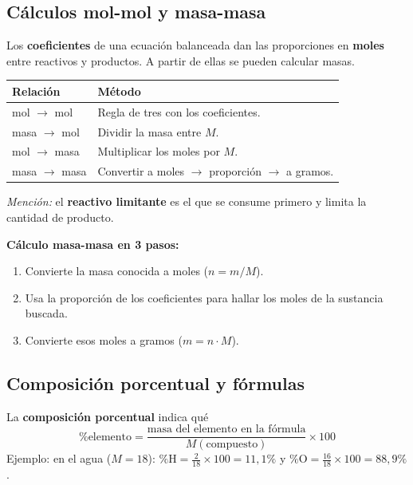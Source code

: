 \documentclass[12pt, letterpaper]{article}
\begin{document}
\subsection{Cálculos mol-mol y masa-masa}

\begin{cuadroteoria}
  Los \textbf{coeficientes} de una ecuación balanceada dan las proporciones en \textbf{moles} entre reactivos y productos. A partir de ellas se pueden calcular masas.
  \begin{center}
    \begin{tabular}{ll}
      \toprule
      Relación                & Método                                                             \\
      \midrule
      mol $\rightarrow$ mol   & Regla de tres con los coeficientes.                                \\
      masa $\rightarrow$ mol  & Dividir la masa entre $M$.                                         \\
      mol $\rightarrow$ masa  & Multiplicar los moles por $M$.                                     \\
      masa $\rightarrow$ masa & Convertir a moles $\rightarrow$ proporción $\rightarrow$ a gramos. \\
      \bottomrule
    \end{tabular}
  \end{center}
  \emph{Mención:} el \textbf{reactivo limitante} es el que se consume primero y limita la cantidad de producto.
\end{cuadroteoria}

\begin{cuadropasos}
  \textbf{Cálculo masa-masa en 3 pasos:}
  \begin{enumerate}[leftmargin=*]
    \item Convierte la masa conocida a moles ($n = m/M$).
    \item Usa la proporción de los coeficientes para hallar los moles de la sustancia buscada.
    \item Convierte esos moles a gramos ($m = n \cdot M$).
  \end{enumerate}
\end{cuadropasos}

\subsection{Composición porcentual y fórmulas}

\begin{cuadroteoria}
  La \textbf{composición porcentual} indica qué %
  $$\% \text{elemento} = \frac{\text{masa del elemento en la fórmula}}{M(\text{compuesto})} \times 100$$
  Ejemplo: en el agua ($M = 18$): $\% \text{H} = \frac{2}{18} \times 100 = 11{,}1\%$ y $\% \text{O} = \frac{16}{18} \times 100 = 88{,}9\%$.
\end{cuadroteoria}
\end{document}
